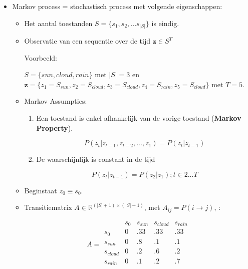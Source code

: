 \begin{itemize}
	\item Markov process = stochastisch process met volgende eigenschappen:
	\begin{itemize}
		\item Het aantal toestanden $S = \{s_1, s_2, ... s_{|S|}\}$ is eindig.
		\item Observatie van een sequentie over de tijd $\textbf{z} \in S^T$
		
		Voorbeeld: 
		
		$S = \{sun, cloud, rain\}$ met $|S| = 3$ en $\textbf{z} = \{z_1=S_{sun},z_2=S_{cloud},z_3=S_{cloud},z_4=S_{rain},z_5=S_{cloud}\}$ met $T = 5$.
		\item Markov Assumpties:
		\begin{enumerate}
			\item Een toestand is enkel afhankelijk van de vorige toestand (\textbf{Markov Property}).
			
			$$P(z_t | z_{t - 1},z_{t-2}, ..., z_1) = P(z_t|z_{t-1})$$
			\item De waarschijnlijk is constant in de tijd
			
			$$P(z_t|z_{t - 1}) = P(z_2|z_1); t \in 2 ...T$$
		\end{enumerate}
		\item Beginstaat $z_0 \equiv s_0$.
		\item Transitiematrix $A \in \mathbb{R}^{(|S| + 1)\times(|S| + 1)}$, met $A_{ij} = P(i \rightarrow j)$, :
		
		$$A = \begin{matrix}
		     & s_0 & s_{sun} & s_{cloud} & s_{rain} \\
		 s_0 & 0 & .33 & .33 & .33 \\
		 s_{sun} & 0 & .8 & .1 & .1 \\
		 s_{cloud} & 0 & .2 & .6 & .2 \\
		 s_{rain} & 0 & .1 & .2 & .7 \\
		\end{matrix}$$
	\end{itemize}

\end{itemize}

